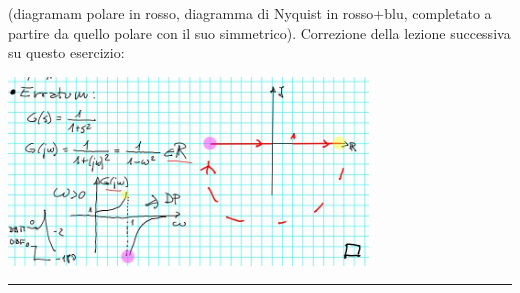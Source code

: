 (diagramam polare in rosso, diagramma di Nyquist in rosso+blu, completato a partire da quello polare con il suo simmetrico).\newline
\newline
Correzione della lezione successiva su questo esercizio:
\begin{center}
    \includegraphics[height=5cm]{../lezione18/img11.JPG}
\end{center}
\rule{\textwidth}{0,4pt} 
